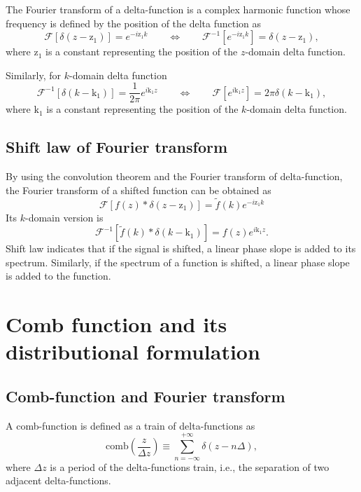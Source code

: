 \documentclass[a4paper]{article}
\newcommand{\ftf}[1]{{\mathcal{F}\left[#1\right]\xspace}}
\newcommand{\iftf}[1]{{\mathcal{F}^{-1}\left[#1\right]\xspace}}
\newcommand{\ftt}[1]{{\tilde{#1}\xspace}}
\newcommand{\comb}[1]{{\mathrm{comb}\left( #1 \right)}\xspace}
\newcommand{\Dz}{{\Delta z}\xspace}
\begin{document}
The Fourier transform of a delta-function is a complex harmonic function whose frequency is defined by the position of the delta function as
\begin{equation}
	\ftf{\delta\left(z-\mathrm{z_1}\right)} = e^{-i \mathrm{z_1} k}
	\qquad\Leftrightarrow\qquad	
	\iftf{e^{-i \mathrm{z_1} k}} = \delta\left(z-\mathrm{z_1}\right),
\end{equation}
where $\mathrm{z_1}$ is a constant representing the position of the $z$-domain delta function.

Similarly, for $k$-domain delta function
\begin{equation}
	\label{eq:deltaK}
	\iftf{\delta\left(k-\mathrm{k_1}\right)} = \frac{1}{2\pi} e^{i \mathrm{k_1} z}
	\qquad\Leftrightarrow\qquad
	\ftf{e^{i \mathrm{k_1} z}} = 2\pi\delta\left(k-\mathrm{k_1}\right),
\end{equation}
where $\mathrm{k_1}$ is a constant representing the position of the $k$-domain delta function.

\subsection{Shift law of Fourier transform}
By using the convolution theorem and the Fourier transform of delta-function, the Fourier transform of a shifted function can be obtained as	
\begin{equation}
	\ftf{ f(z) * \delta\left(z-\mathrm{z_1}\right)} = \ftt{f}(k) e^{-i \mathrm{z_1} k}
\end{equation}
Its $k$-domain version is
\begin{equation}
	\iftf{\ftt{f}(k)* \delta\left(k- \mathrm{k_1}\right)} = f(z) e^{i \mathrm{k_1} z}.
\end{equation}
Shift law indicates that if the signal is shifted, a linear phase slope is added to its spectrum.
Similarly, if the spectrum of a function is shifted, a linear phase slope is added to the function.

\section{Comb function and its distributional formulation}
\subsection{Comb-function and Fourier transform}
A comb-function is defined as a train of delta-functions as
\begin{equation}
	\comb{ \frac{z}{\Dz} }
	\equiv \sum_{n = -\infty}^{+\infty} \delta\left( z- n\Delta \right),
\end{equation}
where $\Delta z$ is a period of the delta-functions train, i.e., the separation of two adjacent delta-functions.
\end{document}

